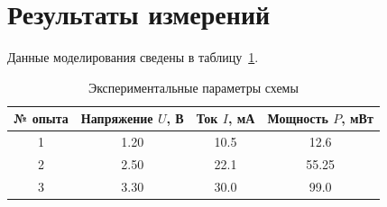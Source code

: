 \section{Результаты измерений}
Данные моделирования сведены в таблицу~\ref{tab:results}.

\begin{table}[h!]
    \caption{Экспериментальные параметры схемы}
    \label{tab:results}
    \centering
    \begin{tabular}{|c|c|c|c|}
        \hline
        \textbf{№ опыта} & \textbf{Напряжение $U$, В} & \textbf{Ток $I$, мА} & \textbf{Мощность $P$, мВт} \\ \hline
        1 & 1.20 & 10.5 & 12.6 \\ \hline
        2 & 2.50 & 22.1 & 55.25 \\ \hline
        3 & 3.30 & 30.0 & 99.0 \\ \hline
    \end{tabular}
\end{table}
